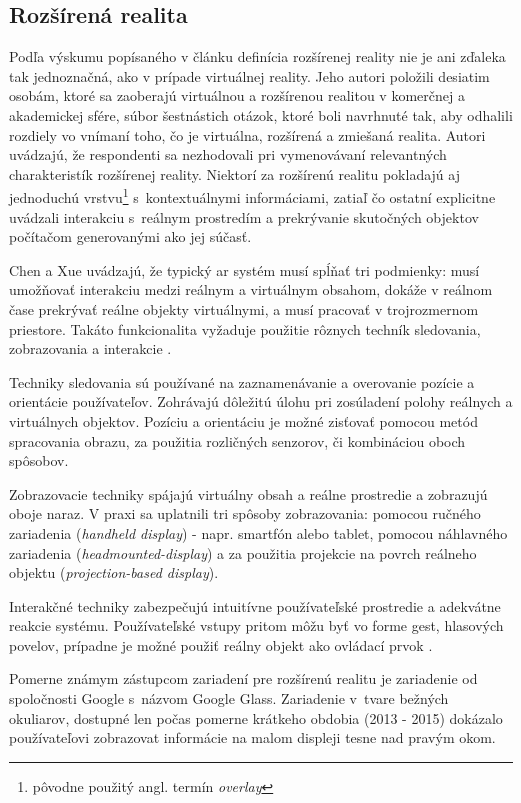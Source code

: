 \subsection{Rozšírená realita}
Podľa výskumu popísaného v článku \cite{speicherWhatMixedReality2019a} definícia rozšírenej reality nie je ani zďaleka tak jednoznačná, ako v prípade virtuálnej reality. 
Jeho autori položili desiatim osobám, ktoré sa zaoberajú virtuálnou a rozšírenou realitou v komerčnej a akademickej sfére, súbor šestnástich otázok, ktoré boli 
navrhnuté tak, aby odhalili rozdiely vo vnímaní toho, čo je virtuálna, rozšírená a zmiešaná realita. Autori uvádzajú, že respondenti sa nezhodovali pri vymenovávaní
relevantných charakteristík rozšírenej reality. Niektorí za rozšírenú realitu pokladajú aj jednoduchú vrstvu\footnote{pôvodne použitý angl. termín \emph{overlay}} 
s~kontextuálnymi informáciami, zatiaľ čo ostatní explicitne uvádzali interakciu s~reálnym prostredím a prekrývanie skutočných objektov počítačom generovanými 
ako jej súčasť.

Chen a Xue uvádzajú, že typický \acrshort{ar} systém musí spĺňať tri podmienky: musí umožňovať interakciu medzi reálnym a virtuálnym obsahom, dokáže v reálnom čase 
prekrývať reálne objekty virtuálnymi, a musí pracovať v trojrozmernom priestore. Takáto funkcionalita vyžaduje použitie rôznych techník sledovania, zobrazovania a
interakcie \cite{chenRenaissanceAugmentedReality2022}.

Techniky sledovania sú používané na zaznamenávanie a overovanie pozície a orientácie používateľov. Zohrávajú dôležitú úlohu pri zosúladení polohy reálnych a virtuálnych
objektov. Pozíciu a orientáciu je možné zisťovať pomocou metód spracovania obrazu, za použitia rozličných senzorov, či kombináciou oboch spôsobov.

Zobrazovacie techniky spájajú virtuálny obsah a reálne prostredie a zobrazujú oboje naraz. V praxi sa uplatnili tri spôsoby zobrazovania: pomocou ručného zariadenia 
(\emph{handheld display}) - napr. smartfón alebo tablet, pomocou náhlavného zariadenia (\emph{headmounted-display}) a za použitia projekcie na povrch reálneho objektu 
(\emph{projection-based display}).

Interakčné techniky zabezpečujú intuitívne používateľské prostredie a adekvátne reakcie systému. Používateľské vstupy pritom môžu byť vo forme gest, hlasových povelov,
prípadne je možné použiť reálny objekt ako ovládací prvok \cite{chenRenaissanceAugmentedReality2022}.

Pomerne známym zástupcom zariadení pre rozšírenú realitu je zariadenie od spoločnosti Google s~názvom Google Glass. Zariadenie v~tvare bežných 
okuliarov, dostupné len počas pomerne krátkeho obdobia (2013 - 2015) \cite{brighamRealityCheckBasics2017} dokázalo používateľovi zobrazovat informácie na malom displeji tesne
nad pravým okom. 

